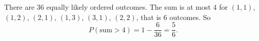 There are $36$ equally likely ordered outcomes. The sum is at most $4$ for $(1,1)$, $(1,2)$, $(2,1)$, $(1,3)$, $(3,1)$, $(2,2)$, that is $6$ outcomes. So
\[
P(\text{sum}>4)=1-\dfrac{6}{36}=\boxed{\dfrac{5}{6}}.
\]
